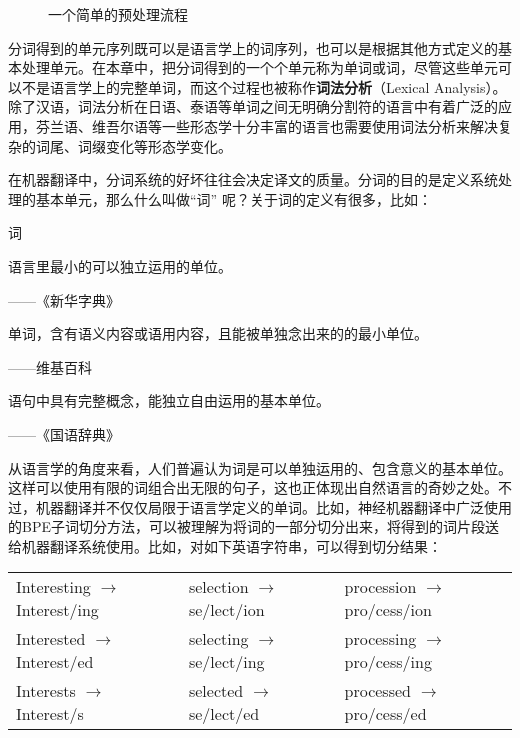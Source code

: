 \begin{figure}[htp]
\centering

\caption{一个简单的预处理流程}
\label{fig:3.2-1}
\end{figure}

\parinterval 分词得到的单元序列既可以是语言学上的词序列，也可以是根据其他方式定义的基本处理单元。在本章中，把分词得到的一个个单元称为单词或词，尽管这些单元可以不是语言学上的完整单词，而这个过程也被称作{\small\sffamily\bfseries{词法分析}}（Lexical Analysis）。除了汉语，词法分析在日语、泰语等单词之间无明确分割符的语言中有着广泛的应用，芬兰语、维吾尔语等一些形态学十分丰富的语言也需要使用词法分析来解决复杂的词尾、词缀变化等形态学变化。

\parinterval 在机器翻译中，分词系统的好坏往往会决定译文的质量。分词的目的是定义系统处理的基本单元，那么什么叫做“词” 呢？关于词的定义有很多，比如：

\vspace{0.5em}
\begin{definition} 词

\vspace{0.5em}
语言里最小的可以独立运用的单位。
\begin{flushright}——《新华字典》\end{flushright}

单词，含有语义内容或语用内容，且能被单独念出来的的最小单位。
\begin{flushright}——维基百科\end{flushright}

语句中具有完整概念，能独立自由运用的基本单位。
\begin{flushright}——《国语辞典》\end{flushright}
\end{definition}


\parinterval 从语言学的角度来看，人们普遍认为词是可以单独运用的、包含意义的基本单位。这样可以使用有限的词组合出无限的句子，这也正体现出自然语言的奇妙之处。不过，机器翻译并不仅仅局限于语言学定义的单词。比如，神经机器翻译中广泛使用的BPE子词切分方法，可以被理解为将词的一部分切分出来，将得到的词片段送给机器翻译系统使用。比如，对如下英语字符串，可以得到切分结果：

\vspace{0.8em}

\noindent
\begin{tabular}{l l l}
Interesting \; $\to$ \; Interest/ing & selection $\to$ \;se/lect/ion & procession $\to$ \; pro/cess/ion  \\
Interested $\to$ \; Interest/ed & selecting $\to$ \; se/lect/ing & processing $\to$ \; pro/cess/ing \\
Interests $\to$ \; Interest/s & selected $\to$ \; se/lect/ed & processed $\to$ \; pro/cess/ed
\end{tabular}

